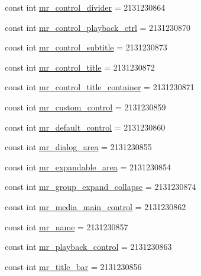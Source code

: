 \begin{CompactItemize}
\item 
const int \hyperlink{class__2doo_1_1_droid_1_1_resource_1_1_id_20674eac0ce82a8a9d9117ffb1a7e9c0}{mr\_\-control\_\-divider} = 2131230864
\item 
const int \hyperlink{class__2doo_1_1_droid_1_1_resource_1_1_id_a111b5a056a6aa3793ec6e5cfc1451b8}{mr\_\-control\_\-playback\_\-ctrl} = 2131230870
\item 
const int \hyperlink{class__2doo_1_1_droid_1_1_resource_1_1_id_1ca68e9115bf53eef5030c9f1143c13f}{mr\_\-control\_\-subtitle} = 2131230873
\item 
const int \hyperlink{class__2doo_1_1_droid_1_1_resource_1_1_id_6bc5690808ad5e175e6aaddc9a5b5f0c}{mr\_\-control\_\-title} = 2131230872
\item 
const int \hyperlink{class__2doo_1_1_droid_1_1_resource_1_1_id_dd5bd5a477f98563ab24fd76b8903dd2}{mr\_\-control\_\-title\_\-container} = 2131230871
\item 
const int \hyperlink{class__2doo_1_1_droid_1_1_resource_1_1_id_444e98c4ab3525c565d1dd3537a35fde}{mr\_\-custom\_\-control} = 2131230859
\item 
const int \hyperlink{class__2doo_1_1_droid_1_1_resource_1_1_id_b5fefb7045e075e938daa63992a24d67}{mr\_\-default\_\-control} = 2131230860
\item 
const int \hyperlink{class__2doo_1_1_droid_1_1_resource_1_1_id_26b02d9ac73419bf3ca377f9313898ec}{mr\_\-dialog\_\-area} = 2131230855
\item 
const int \hyperlink{class__2doo_1_1_droid_1_1_resource_1_1_id_cffd49c74991c694492cdc4eb9d2dd2c}{mr\_\-expandable\_\-area} = 2131230854
\item 
const int \hyperlink{class__2doo_1_1_droid_1_1_resource_1_1_id_a403893a07cfbd81f2cd23ea854ccb99}{mr\_\-group\_\-expand\_\-collapse} = 2131230874
\item 
const int \hyperlink{class__2doo_1_1_droid_1_1_resource_1_1_id_5a4c0cd7b4d7bec6eb43e226d4749e0f}{mr\_\-media\_\-main\_\-control} = 2131230862
\item 
const int \hyperlink{class__2doo_1_1_droid_1_1_resource_1_1_id_345eec58774808e9d06676993e11886a}{mr\_\-name} = 2131230857
\item 
const int \hyperlink{class__2doo_1_1_droid_1_1_resource_1_1_id_747e949c316739aa924f2e14d844151f}{mr\_\-playback\_\-control} = 2131230863
\item 
const int \hyperlink{class__2doo_1_1_droid_1_1_resource_1_1_id_c0bc7c77a378db7b13d31fab24439919}{mr\_\-title\_\-bar} = 2131230856
\item 

\end{CompactItemize}
